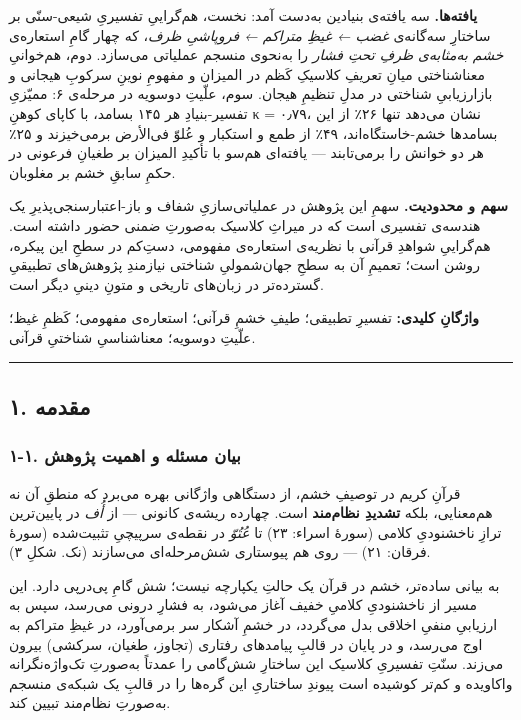\documentclass[12pt,a4paper]{article}
\begin{document}
\begin{RTL}
\begin{otherlanguage}{persian}
\textbf{یافته‌ها.} سه یافته‌ی بنیادین به‌دست آمد: نخست، هم‌گراییِ تفسیریِ
شیعی-سنّی بر ساختارِ سه‌گانه‌ی \emph{غضب ← غیظِ متراکم ← فروپاشیِ ظرف}، که
چهار گامِ استعاره‌ی \emph{خشم به‌مثابه‌ی ظرفِ تحتِ فشار} را به‌نحوی منسجم
عملیاتی می‌سازد. دوم، هم‌خوانیِ معناشناختی میانِ تعریفِ کلاسیکِ کَظم در المیزان
و مفهومِ نوینِ سرکوبِ هیجانی و بازارزیابیِ شناختی در مدلِ تنظیمِ هیجان. سوم،
علّیتِ دوسویه در مرحله‌ی ۶: ممیّزیِ تفسیر-بنیادِ هر ۱۴۵ بسامد، با کاپای کوهنِ κ
= ۰٫۷۹، نشان می‌دهد تنها ۲۶٪ از این بسامدها خشم-خاستگاه‌اند، ۴۹٪ از طمع و
استکبار و عُلوّ فی‌الأرض برمی‌خیزند و ۲۵٪ هر دو خوانش را برمی‌تابند ---
یافته‌ای هم‌سو با تأکیدِ المیزان بر طغیانِ فرعونی در حکمِ سابقِ خشم بر
مغلوبان.

\textbf{سهم و محدودیت.} سهمِ این پژوهش در عملیاتی‌سازیِ شفاف و
باز-اعتبارسنجی‌پذیرِ یک هندسه‌ی تفسیری است که در میراثِ کلاسیک به‌صورتِ ضمنی
حضور داشته است. هم‌گراییِ شواهدِ قرآنی با نظریه‌ی استعاره‌ی مفهومی، دستِ‌کم در
سطحِ این پیکره، روشن است؛ تعمیمِ آن به سطحِ جهان‌شمولیِ شناختی نیازمندِ
پژوهش‌های تطبیقیِ گسترده‌تر در زبان‌های تاریخی و متونِ دینیِ دیگر است.

\textbf{واژگانِ کلیدی:} تفسیرِ تطبیقی؛ طیفِ خشمِ قرآنی؛ استعاره‌ی مفهومی؛ کَظمِ
غیظ؛ علّیتِ دوسویه؛ معناشناسیِ شناختیِ قرآنی.

\begin{center}\rule{0.5\linewidth}{0.5pt}\end{center}

\subsection{۱. مقدمه}\label{ux645ux642ux62fux645ux647}

\subsubsection{۱-۱. بیان مسئله و اهمیت
پژوهش}\label{ux628ux6ccux627ux646-ux645ux633ux626ux644ux647-ux648-ux627ux647ux645ux6ccux62a-ux67eux698ux648ux647ux634}

قرآنِ کریم در توصیفِ خشم، از دستگاهی واژگانی بهره می‌برد که منطقِ آن نه
هم‌معنایی، بلکه \textbf{تشدیدِ نظام‌مند} است. چهارده ریشه‌ی کانونی --- از
\emph{أُف} در پایین‌ترین ترازِ ناخشنودیِ کلامی (سورۀ اسراء: ۲۳) تا
\emph{عُتُوّ} در نقطه‌ی سرپیچیِ تثبیت‌شده (سورۀ فرقان: ۲۱) --- روی هم پیوستاری
شش‌مرحله‌ای می‌سازند (نک. شکلِ ۳).

به بیانی ساده‌تر، خشم در قرآن یک حالتِ یکپارچه نیست؛ شش گامِ پی‌درپی دارد.
این مسیر از ناخشنودیِ کلامیِ خفیف آغاز می‌شود، به فشارِ درونی می‌رسد، سپس به
ارزیابیِ منفیِ اخلاقی بدل می‌گردد، در خشمِ آشکار سر برمی‌آورد، در غیظِ متراکم
به اوج می‌رسد، و در پایان در قالبِ پیامدهای رفتاری (تجاوز، طغیان، سرکشی)
بیرون می‌زند. سنّتِ تفسیریِ کلاسیک این ساختارِ شش‌گامی را عمدتاً به‌صورتِ
تک‌واژه‌نگرانه واکاویده و کم‌تر کوشیده است پیوندِ ساختاریِ این گره‌ها را در
قالبِ یک شبکه‌ی منسجم به‌صورتِ نظام‌مند تبیین کند.


\end{otherlanguage}
\end{RTL}
\end{document}
